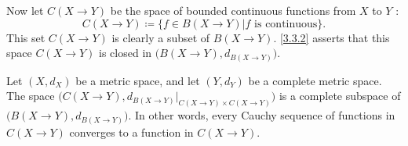 \begin{note}
  Now let \(C(X \to Y)\) be the space of bounded continuous functions from \(X\) to \(Y\) :
  \[
    C(X \to Y) \coloneqq \{f \in B(X \to Y) | f \text{ is continuous}\}.
  \]
  This set \(C(X \to Y)\) is clearly a subset of \(B(X \to Y)\).
  \cref{3.3.2} asserts that this space \(C(X \to Y)\) is closed in \(\big(B(X \to Y), d_{B(X \to Y)}\big)\).
\end{note}

\begin{theorem}\label{3.4.5}
  Let \((X, d_X)\) be a metric space, and let \((Y, d_Y)\) be a complete metric space.
  The space \(\big(C(X \to Y), d_{B(X \to Y)}|_{C(X \to Y) \times C(X \to Y)}\big)\) is a complete subspace of \(\big(B(X \to Y), d_{B(X \to Y)}\big)\).
  In other words, every Cauchy sequence of functions in \(C(X \to Y)\) converges to a function in \(C(X \to Y)\).
\end{theorem}

